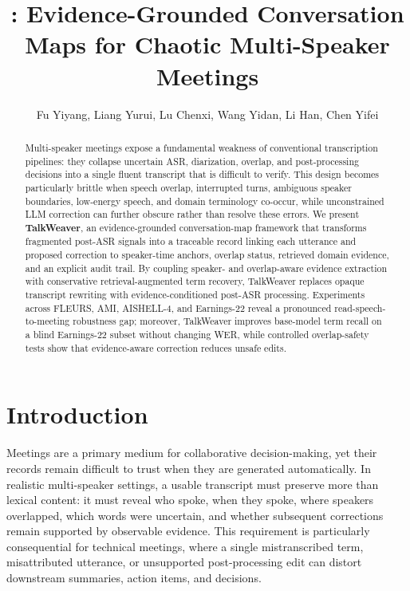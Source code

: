 \documentclass[10pt,twocolumn]{article}
\title{\tw: Evidence-Grounded Conversation Maps for Chaotic Multi-Speaker Meetings}
\author{Fu Yiyang, Liang Yurui, Lu Chenxi, Wang Yidan, Li Han, Chen Yifei}
\date{}
\begin{document}
\maketitle

\begin{abstract}
Multi-speaker meetings expose a fundamental weakness of conventional transcription pipelines: they collapse uncertain ASR, diarization, overlap, and post-processing decisions into a single fluent transcript that is difficult to verify. This design becomes particularly brittle when speech overlap, interrupted turns, ambiguous speaker boundaries, low-energy speech, and domain terminology co-occur, while unconstrained LLM correction can further obscure rather than resolve these errors. We present \textbf{TalkWeaver}, an evidence-grounded conversation-map framework that transforms fragmented post-ASR signals into a traceable record linking each utterance and proposed correction to speaker-time anchors, overlap status, retrieved domain evidence, and an explicit audit trail. By coupling speaker- and overlap-aware evidence extraction with conservative retrieval-augmented term recovery, TalkWeaver replaces opaque transcript rewriting with evidence-conditioned post-ASR processing. Experiments across FLEURS, AMI, AISHELL-4, and Earnings-22 reveal a pronounced read-speech-to-meeting robustness gap; moreover, TalkWeaver improves base-model term recall on a blind Earnings-22 subset without changing WER, while controlled overlap-safety tests show that evidence-aware correction reduces unsafe edits.
\end{abstract}

\section{Introduction}

Meetings are a primary medium for collaborative decision-making, yet their records remain difficult to trust when they are generated automatically. In realistic multi-speaker settings, a usable transcript must preserve more than lexical content: it must reveal who spoke, when they spoke, where speakers overlapped, which words were uncertain, and whether subsequent corrections remain supported by observable evidence. This requirement is particularly consequential for technical meetings, where a single mistranscribed term, misattributed utterance, or unsupported post-processing edit can distort downstream summaries, action items, and decisions.
\end{document}
